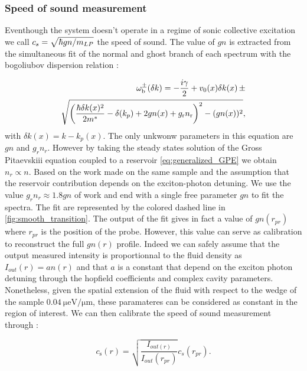 \bigskip

\subsubsection{Speed of sound measurement} Eventhough the system doesn't operate in a regime of sonic collective excitation we call $c_s=\sqrt{\hbar g n/m_{LP}}$ the speed of sound. The value of $gn$ is extracted 
from the simultaneous fit of the normal and ghost branch of each spectrum with the bogoliubov dispersion relation :

\begin{equation}
    \label{eq:lfbogo}
    \begin{split}
        \omega_{\mathrm{b}}^{\pm}(\delta k)= -\frac{i\gamma}{2}+ v_0(x) \delta k(x)\,\pm \\\sqrt{\left(\frac{\hbar \delta k(x)^2}{2m^*}-\delta(k_p) +2gn(x) +g_\mathrm{r} n_\mathrm{r}    \right)^2-(gn(x))^2},
    \end{split}
\end{equation}
with $\delta k(x)=k-k_p(x)$. The only unkwonw parameters in this equation are $gn$ and $g_rn_r$. However by taking the steady states solution of the Gross Pitaevskiii equation coupled to a reservoir \autoref{eq:generalized_GPE} we obtain $n_r\propto n$.
Based on the work \cite{claude_phd,claude_high-resolution_2022} made on the same sample and the assumption that the reservoir contribution depends on the exciton-photon detuning. We use the value $g_rn_r\approx 1.8gn$ of work \cite{claude_phd} and end 
with a single free parameter $gn$ to fit the spectra. The fit are represented by the colored dashed line in \autoref{fig:smooth_transition}. The output of the fit gives in fact a value of $gn(r_{pr})$ where $r_{pr}$ is the position of the probe. However, this value can serve 
as calibration to reconstruct the full $gn(r)$ profile. Indeed we can safely assume that the output measured intensity is proportionnal to the 
fluid density as $I_{out}(r)=a n(r)$ and that $a$ is a constant that depend on the exciton photon detuning through the hopfield coefficients and complex 
cavity parameters. Nonetheless, given the spatial extension of the fluid with respect to the wedge of the sample $\SI{0.04}{\micro \electronvolt \per \micro \meter}$, these paramateres can be considered as constant in the region of interest.
We can then calibrate the speed of sound measurement through :

\begin{equation}
    \label{eq:speed_of_sound_calib}
    c_\mathrm{s}(r)=\sqrt{\frac{I_{out(r)}}{I_{out}(r_{pr})}}c_s(r_{pr}).
\end{equation}

